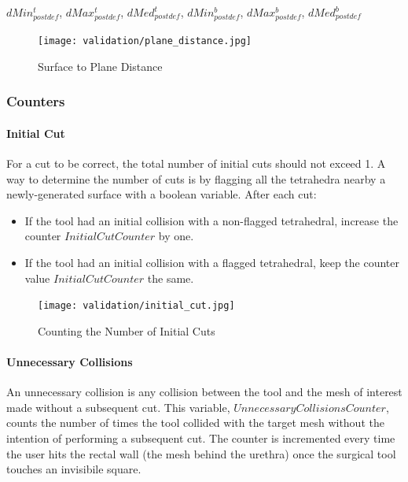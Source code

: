 \hfill

$dMin_{postdef}^t$, $dMax_{postdef}^t$, $dMed_{postdef}^t$, $dMin_{postdef}^b$, $dMax_{postdef}^b$, $dMed_{postdef}^b$

\begin{figure}
  \centering%
  \texttt{[image: validation/plane\_distance.jpg]}
  \caption{Surface to Plane Distance}
  \label{fig:surface_to_plane_distance}
\end{figure}

\subsubsection{Counters}
\label{para:data_counters}

\paragraph{Initial Cut}
\label{para:data_counters_initial_cut}

For a cut to be correct, the total number of initial cuts should not exceed 1. A way to determine the number of cuts is by flagging all the tetrahedra nearby a newly-generated surface with a boolean variable. After each cut:

\begin{itemize}
\item If the tool had an initial collision with a non-flagged tetrahedral, increase the counter $InitialCutCounter$ by one.
\item If the tool had an initial collision with a flagged tetrahedral, keep the counter value $InitialCutCounter$ the same.
\end{itemize}

\begin{figure}
  \centering%
  \texttt{[image: validation/initial\_cut.jpg]}
  \caption{Counting the Number of Initial Cuts}
  \label{fig:ideal_cut}
\end{figure}


\paragraph{Unnecessary Collisions}
\label{para:data_counters_unnecessary_collisions}

An unnecessary collision is any collision between the tool and the mesh of interest made without a subsequent cut. This variable, $UnnecessaryCollisionsCounter$, counts the number of times the tool collided with the target mesh without the intention of performing a subsequent cut. The counter is incremented every time the user hits the rectal wall (the mesh behind the urethra) once the surgical tool touches an invisibile square.

